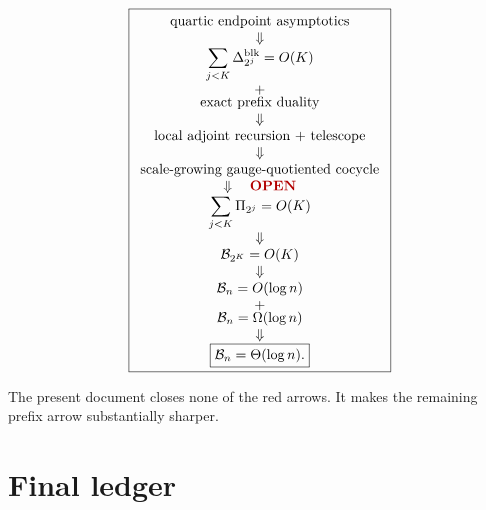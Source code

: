 \documentclass[11pt,a4paper]{article}
\newcommand{\Bcal}{\mathcal B}
\newcommand{\blk}{\mathrm{blk}}
\newcommand{\OPEN}{\textcolor{red!70!black}{\textbf{OPEN}}}
\begin{document}
\[
\boxed{
\begin{array}{c}
\text{quartic endpoint asymptotics}
\\
\Downarrow
\\
\displaystyle
\sum_{j<K}\Delta_{2^j}^{\blk}=O(K)
\\[3mm]
+
\\[-1mm]
\text{exact prefix duality}
\\
\Downarrow
\\
\text{local adjoint recursion + telescope}
\\
\Downarrow
\\
\text{scale-growing gauge-quotiented cocycle}
\\
\Downarrow\quad\OPEN
\\
\displaystyle
\sum_{j<K}\Pi_{2^j}=O(K)
\\[3mm]
\Downarrow
\\
\Bcal_{2^K}=O(K)
\\
\Downarrow
\\
\Bcal_n=O(\log n)
\\
+
\\[-1mm]
\Bcal_n=\Omega(\log n)
\\
\Downarrow
\\
\boxed{\Bcal_n=\Theta(\log n).}
\end{array}
}
\]

The present document closes none of the red arrows.
It makes the remaining prefix arrow substantially sharper.

\section{Final ledger}
\end{document}
